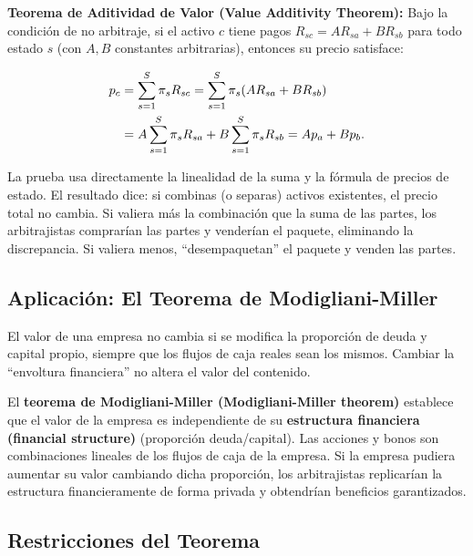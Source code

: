 \documentclass[12pt]{article}
\begin{document}
\textbf{Teorema de Aditividad de Valor (Value Additivity Theorem):} Bajo la condici\'on de no arbitraje, si el activo $c$ tiene pagos $R_{sc} = AR_{sa} + BR_{sb}$ para todo estado $s$ (con $A, B$ constantes arbitrarias), entonces su precio satisface:

\begin{align}
  p_c &= \sum_{s=1}^{S} \pi_s R_{sc}
       = \sum_{s=1}^{S} \pi_s(AR_{sa} + BR_{sb}) \notag \\
      &= A\sum_{s=1}^{S} \pi_s R_{sa} + B\sum_{s=1}^{S} \pi_s R_{sb}
       = Ap_a + Bp_b.
  \label{eq:aditividad}
\end{align}

\begin{intuicionmat}
La prueba usa directamente la linealidad de la suma y la f\'ormula de precios de estado. El resultado dice: si combinas (o separas) activos existentes, el precio total no cambia. Si valiera m\'as la combinaci\'on que la suma de las partes, los arbitrajistas comprar\'ian las partes y vender\'ian el paquete, eliminando la discrepancia. Si valiera menos, ``desempaquetan'' el paquete y venden las partes.
\end{intuicionmat}

\subsection{Aplicaci\'on: El Teorema de Modigliani-Miller}

\begin{intuicion}
El valor de una empresa no cambia si se modifica la proporci\'on de deuda y capital propio, siempre que los flujos de caja reales sean los mismos. Cambiar la ``envoltura financiera'' no altera el valor del contenido.
\end{intuicion}

El \textbf{teorema de Modigliani-Miller (Modigliani-Miller theorem)} establece que el valor de la empresa es independiente de su \textbf{estructura financiera (financial structure)} (proporci\'on deuda/capital). Las acciones y bonos son combinaciones lineales de los flujos de caja de la empresa. Si la empresa pudiera aumentar su valor cambiando dicha proporci\'on, los arbitrajistas replicar\'ian la estructura financieramente de forma privada y obtendr\'ian beneficios garantizados.

\subsection{Restricciones del Teorema}
\end{document}
